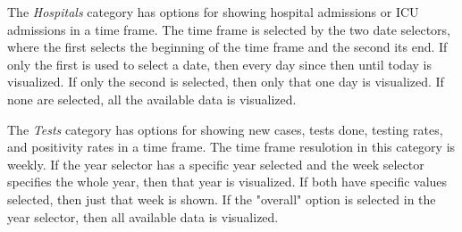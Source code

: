 \documentclass[pdftex, 11pt, a4paper]{article}
\begin{document}
    The \emph{Hospitals} category has options for showing hospital admissions or ICU
    admissions in a time frame. The time frame is selected by the two date selectors,
    where the first selects the beginning of the time frame and the second its end.
    If only the first is used to select a date, then every day since then until today
    is visualized. If only the second is selected, then only that one day is visualized.
    If none are selected, all the available data is visualized.

    The \emph{Tests} category has options for showing new cases, tests done, testing rates,
    and positivity rates in a time frame. The time frame resulotion in this category is
    weekly. If the year selector has a specific year selected and the week selector specifies
    the whole year, then that year is visualized. If both have specific values selected,
    then just that week is shown. If the "overall" option is selected in the year selector,
    then all available data is visualized.
\end{document}
